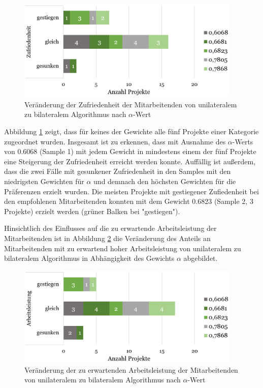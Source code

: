 \begin{figure}[H]
    \centering
	\includegraphics[width=0.95\textwidth]{gfx/verhaeltnis-z-nach-alpha-ges.png}
	\caption[Veränderung der Zufriedenheit der Mitarbeitenden von unilateralem zu bilateralem Algorithmus nach $\alpha$-Wert]{Veränderung der Zufriedenheit der Mitarbeitenden von unilateralem zu bilateralem Algorithmus nach $\alpha$-Wert}
	\label{fig:ergebnisse:abb12}
\end{figure}

Abbildung \ref{fig:ergebnisse:abb12} zeigt, dass für keines der Gewichte alle fünf Projekte einer Kategorie zugeordnet wurden.
Insgesamt ist zu erkennen, dass mit Ausnahme des $\alpha$-Werts von 0.6068 (Sample 1) mit jedem Gewicht in mindestens einem der fünf Projekte eine Steigerung der Zufriedenheit erreicht werden konnte.
Auffällig ist außerdem, dass die zwei Fälle mit gesunkener Zufriedenheit in den Samples mit den niedrigsten Gewichten für $\alpha$ und demnach den höchsten Gewichten für die Präferenzen erzielt wurden.
Die meisten Projekte mit gestiegener Zufiedenheit bei den empfohlenen Mitarbeitenden konnten mit dem Gewicht 0.6823 (Sample 2, 3 Projekte) erzielt werden (grüner Balken bei "gestiegen").

Hinsichtlich des Einflusses auf die zu erwartende Arbeitsleistung der Mitarbeitenden ist in Abbildung \ref{fig:ergebnisse:abb13} die Veränderung des Anteils an Mitarbeitenden mit zu erwartend hoher Arbeitsleistung von unilateralem zu bilateralem Algorithmus in Abhängigkeit des Gewichts $\alpha$ abgebildet.

\begin{figure}[H]
    \centering
	\includegraphics[width=0.95\textwidth]{gfx/verhaeltnis-a-nach-alpha-ges.png}
	\caption[Veränderung der zu erwartenden Arbeitsleistung der Mitarbeitenden von unilateralem zu bilateralem Algorithmus nach $\alpha$-Wert]{Veränderung der zu erwartenden Arbeitsleistung der Mitarbeitenden von unilateralem zu bilateralem Algorithmus nach $\alpha$-Wert}
	\label{fig:ergebnisse:abb13}
\end{figure}


